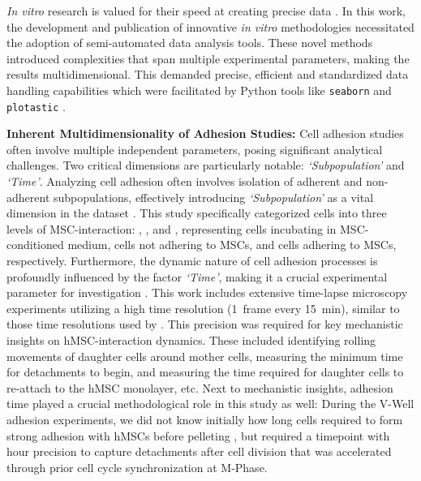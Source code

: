 



%
\label{sec:discussion_semi_automated_analysis}%
\textit{In vitro} research is valued for their speed at creating precise data
\cite{moleiroCriticalAnalysisAvailable2017}. In this work, the development and
publication of innovative \textit{in vitro} methodologies necessitated the adoption of
semi-automated data analysis tools. These novel methods introduced complexities
that span multiple experimental parameters, making the results multidimensional.
This demanded precise, efficient and standardized data handling capabilities
which were facilitated by Python tools like \texttt{seaborn} and
\texttt{plotastic} \cite{waskomSeabornStatisticalData2021,kuricPlotasticBridgingPlotting2024}.


\textbf{Inherent Multidimensionality of Adhesion Studies:}
Cell adhesion studies often involve multiple independent parameters, posing
significant analytical challenges. Two critical dimensions are particularly
notable: \emph{`Subpopulation'} and \emph{`Time'}. Analyzing cell adhesion often
involves isolation of adherent and non-adherent subpopulations, effectively
introducing \textit{`Subpopulation'} as a vital dimension in the dataset
\cite{dziadowiczBoneMarrowStromaInduced2022}. This study specifically
categorized cells into three levels of MSC-interaction: \CMina, \nMAina, and
\MAina, representing \INA cells incubating in MSC-conditioned medium, \INA cells
not adhering to MSCs, and \INA cells adhering to MSCs, respectively.
Furthermore, the dynamic nature of cell adhesion processes is profoundly
influenced by the factor \emph{`Time'}, making it a crucial experimental
parameter for investigation \cite{reblTimedependentMetabolicActivity2010,
    mckayCellcellAdhesionMolecules1997,
    bolado-carrancioPeriodicPropagatingWaves2020a}. This work includes extensive
time-lapse microscopy experiments utilizing a high time resolution
(\SI{1}{frame} every \SI{15}{\minute}), similar to those time resolutions used
by \citet{purschkePhototoxicityHoechst333422010}. This precision was required
for key mechanistic insights on hMSC-\INA interaction dynamics. These included
identifying rolling movements of \nMAina daughter cells around \MAina mother
cells, measuring the minimum time for \INA detachments to begin, and measuring
the time required for daughter cells to re-attach to the hMSC monolayer, etc.
Next to mechanistic insights, adhesion time played a crucial methodological role
in this study as well: During the V-Well adhesion experiments, we did not know
initially how long \INA cells required to form strong adhesion with hMSCs before
pelleting \nMAina, but required a timepoint with hour precision to capture
detachments after cell division that was accelerated through prior cell cycle
synchronization at M-Phase.

